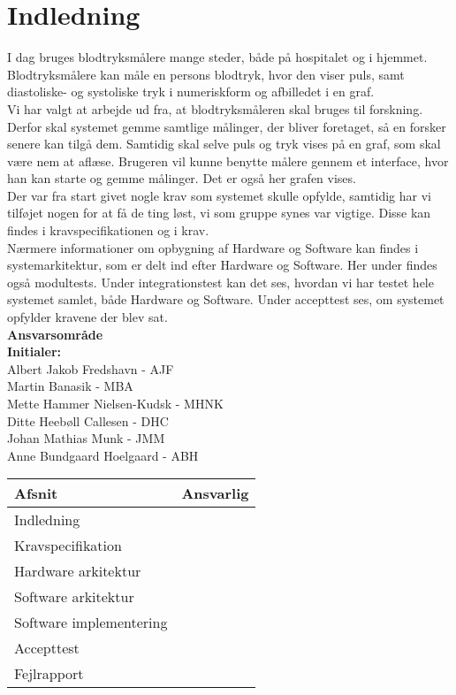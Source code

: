 \chapter{Indledning}
I  dag bruges blodtryksmålere mange steder, både på hospitalet og i hjemmet. \cite{Test} Blodtryksmålere kan måle en persons blodtryk, hvor den viser puls, samt diastoliske- og systoliske tryk i numeriskform og afbilledet i en graf.\\ 
Vi har valgt at arbejde ud fra, at blodtryksmåleren skal bruges til forskning. Derfor skal systemet gemme samtlige målinger, der bliver foretaget, så en forsker senere kan tilgå dem. Samtidig skal selve puls og tryk vises på en graf, som skal være nem at aflæse. Brugeren vil kunne benytte målere gennem et interface, hvor han kan starte og gemme målinger. Det er også her grafen vises. \\
Der var fra start givet nogle krav som systemet skulle opfylde, samtidig har vi tilføjet nogen for at få de ting løst, vi som gruppe synes var vigtige. Disse kan findes i kravspecifikationen og i krav.\\
Nærmere informationer om opbygning af Hardware og Software kan findes i systemarkitektur, som er delt ind efter Hardware og Software. Her under findes også modultests. 
Under integrationstest kan det ses, hvordan vi har testet hele systemet samlet, både Hardware og Software. Under accepttest ses, om systemet opfylder kravene der blev sat.\\ 


\textbf{Ansvarsområde} \\
\textbf{Initialer: } \\
Albert Jakob Fredshavn - AJF \\
Martin Banasik - MBA \\
Mette Hammer Nielsen-Kudsk - MHNK \\
Ditte Heebøll Callesen - DHC \\
Johan Mathias Munk - JMM \\
Anne Bundgaard Hoelgaard - ABH \\


\begin{longtabu} to 
    Afsnit &    Ansvarlig\\[-1ex]
    \midrule
    Indledning & \\
    Kravspecifikation & \\
    Hardware arkitektur & \\
    Software arkitektur & \\
    Software implementering & \\
    Accepttest & \\
    Fejlrapport & \\
    
    
    

\end{longtabu}
